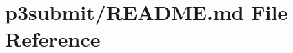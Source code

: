 \hypertarget{p3submit_2README_8md}{\section{p3submit/\-R\-E\-A\-D\-M\-E.md File Reference}
\label{p3submit_2README_8md}
}
